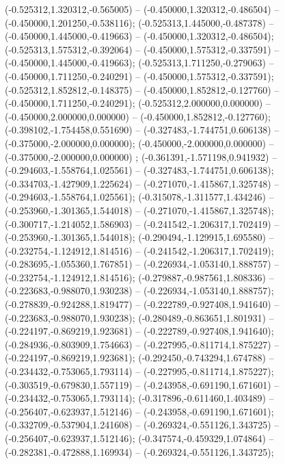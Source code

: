  (-0.525312,1.320312,-0.565005) -- (-0.450000,1.320312,-0.486504) -- (-0.450000,1.201250,-0.538116);
 (-0.525313,1.445000,-0.487378) -- (-0.450000,1.445000,-0.419663) -- (-0.450000,1.320312,-0.486504);
 (-0.525313,1.575312,-0.392064) -- (-0.450000,1.575312,-0.337591) -- (-0.450000,1.445000,-0.419663);
 (-0.525313,1.711250,-0.279063) -- (-0.450000,1.711250,-0.240291) -- (-0.450000,1.575312,-0.337591);
 (-0.525312,1.852812,-0.148375) -- (-0.450000,1.852812,-0.127760) -- (-0.450000,1.711250,-0.240291);
 (-0.525312,2.000000,0.000000) -- (-0.450000,2.000000,0.000000) -- (-0.450000,1.852812,-0.127760);
 (-0.398102,-1.754458,0.551690) -- (-0.327483,-1.744751,0.606138) -- (-0.375000,-2.000000,0.000000);
 (-0.450000,-2.000000,0.000000) -- (-0.375000,-2.000000,0.000000) ;
 (-0.361391,-1.571198,0.941932) -- (-0.294603,-1.558764,1.025561) -- (-0.327483,-1.744751,0.606138);
 (-0.334703,-1.427909,1.225624) -- (-0.271070,-1.415867,1.325748) -- (-0.294603,-1.558764,1.025561);
 (-0.315078,-1.311577,1.434246) -- (-0.253960,-1.301365,1.544018) -- (-0.271070,-1.415867,1.325748);
 (-0.300717,-1.214052,1.586903) -- (-0.241542,-1.206317,1.702419) -- (-0.253960,-1.301365,1.544018);
 (-0.290494,-1.129915,1.695580) -- (-0.232754,-1.124912,1.814516) -- (-0.241542,-1.206317,1.702419);
 (-0.283695,-1.055360,1.767851) -- (-0.226934,-1.053140,1.888757) -- (-0.232754,-1.124912,1.814516);
 (-0.279887,-0.987561,1.808336) -- (-0.223683,-0.988070,1.930238) -- (-0.226934,-1.053140,1.888757);
 (-0.278839,-0.924288,1.819477) -- (-0.222789,-0.927408,1.941640) -- (-0.223683,-0.988070,1.930238);
 (-0.280489,-0.863651,1.801931) -- (-0.224197,-0.869219,1.923681) -- (-0.222789,-0.927408,1.941640);
 (-0.284936,-0.803909,1.754663) -- (-0.227995,-0.811714,1.875227) -- (-0.224197,-0.869219,1.923681);
 (-0.292450,-0.743294,1.674788) -- (-0.234432,-0.753065,1.793114) -- (-0.227995,-0.811714,1.875227);
 (-0.303519,-0.679830,1.557119) -- (-0.243958,-0.691190,1.671601) -- (-0.234432,-0.753065,1.793114);
 (-0.317896,-0.611460,1.403489) -- (-0.256407,-0.623937,1.512146) -- (-0.243958,-0.691190,1.671601);
 (-0.332709,-0.537904,1.241608) -- (-0.269324,-0.551126,1.343725) -- (-0.256407,-0.623937,1.512146);
 (-0.347574,-0.459329,1.074864) -- (-0.282381,-0.472888,1.169934) -- (-0.269324,-0.551126,1.343725);
